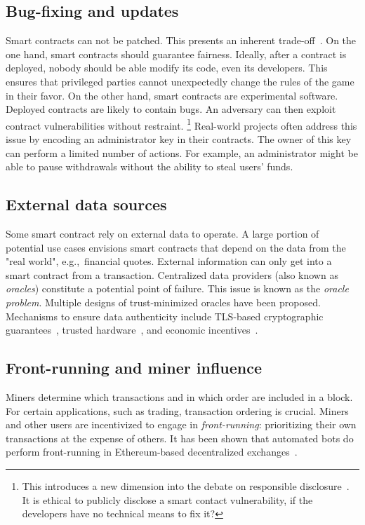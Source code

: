 \subsection{Bug-fixing and updates}
Smart contracts can not be patched.
This presents an inherent trade-off~\cite{Porru2017}.
On the one hand, smart contracts should guarantee fairness.
Ideally, after a contract is deployed, nobody should be able modify its code, even its developers.
This ensures that privileged parties cannot unexpectedly change the rules of the game in their favor.
On the other hand, smart contracts are experimental software.
Deployed contracts are likely to contain bugs.
An adversary can then exploit contract vulnerabilities without restraint.
\footnote{This introduces a new dimension into the debate on responsible disclosure~\cite{Schneier2007}. It is ethical to publicly disclose a smart contact vulnerability, if the developers have no technical means to fix it?}
Real-world projects often address this issue by encoding an administrator key in their contracts.
The owner of this key can perform a limited number of actions.
For example, an administrator might be able to pause withdrawals without the ability to steal users' funds.

\subsection{External data sources}
Some smart contract rely on external data to operate.
A large portion of potential use cases envisions smart contracts that depend on the data from the "real world", e.g.,~financial quotes.
External information can only get into a smart contract from a transaction.
Centralized data providers (also known as \textit{oracles}) constitute a potential point of failure.
This issue is known as the \textit{oracle problem}.
Multiple designs of trust-minimized oracles have been proposed.
Mechanisms to ensure data authenticity include TLS-based cryptographic guarantees~\cite{Provable}, trusted hardware~\cite{Zhang2016}, and economic incentives~\cite{Chainlink}.

\subsection{Front-running and miner influence}
Miners determine which transactions and in which order are included in a block.
For certain applications, such as trading, transaction ordering is crucial.
Miners and other users are incentivized to engage in \textit{front-running}: prioritizing their own transactions at the expense of others.
It has been shown that automated bots do perform front-running in Ethereum-based decentralized exchanges~\cite{Daian2019}.

